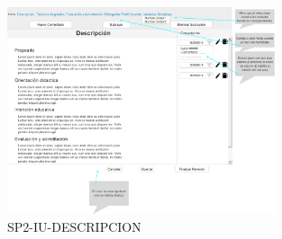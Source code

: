 \begin{figure}
  \centering
    \includegraphics[width=0.7\textwidth]{DCU/SP2/Pantallas/Descripcion}
  \caption{SP2-IU-DESCRIPCION}
  \label{SP2-IU-DESCRIPCION}
\end{figure}

